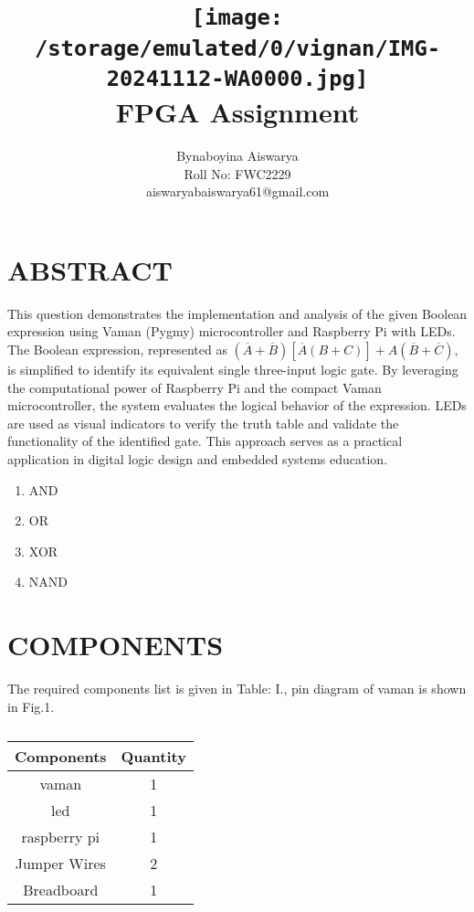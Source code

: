 \documentclass[conference]{IEEEtran}
\title{
\vspace{1cm}
{\texttt{[image:  
 /storage/emulated/0/vignan/IMG-20241112-WA0000.jpg]} \\ FPGA Assignment}}
\author{Bynaboyina Aiswarya \\ Roll No: FWC2229 \\ aiswaryabaiswarya61@gmail.com}
\begin{document}
\maketitle
 \section{ABSTRACT}

This question demonstrates the implementation and analysis of the given Boolean expression using Vaman (Pygmy) microcontroller and Raspberry Pi with LEDs. The Boolean expression, represented as \((\overline{A} + \overline{B})[\overline{A}(B + C)] + A(\overline{B} + \overline{C})\), is simplified to identify its equivalent single three-input logic gate. By leveraging the computational power of Raspberry Pi and the compact Vaman microcontroller, the system evaluates the logical behavior of the expression. LEDs are used as visual indicators to verify the truth table and validate the functionality of the identified gate. This approach serves as a practical application in digital logic design and embedded systems education.

 \begin{enumerate}
	 \item AND
	 \item OR
	 \item XOR
	 \item NAND
 \end{enumerate}

\section{COMPONENTS} 

The required components list is given in Table: I., pin diagram of vaman is shown in Fig.1.
\vspace{0.3cm}
 \begin{table} [htbp]
\centering
\begin{tabular}{| c | c |} \hline
Components  & Quantity \\\hline
vaman   & 1 \\ \hline
led  & 1 \\ \hline
raspberry pi & 1 \\ \hline
Jumper Wires   & 2 \\ \hline
Breadboard & 1 \\ 
\hline
\end{tabular}
\vspace{0.1cm}
\caption{\label{tab:widgets}}
\end{table}
\end{document}
